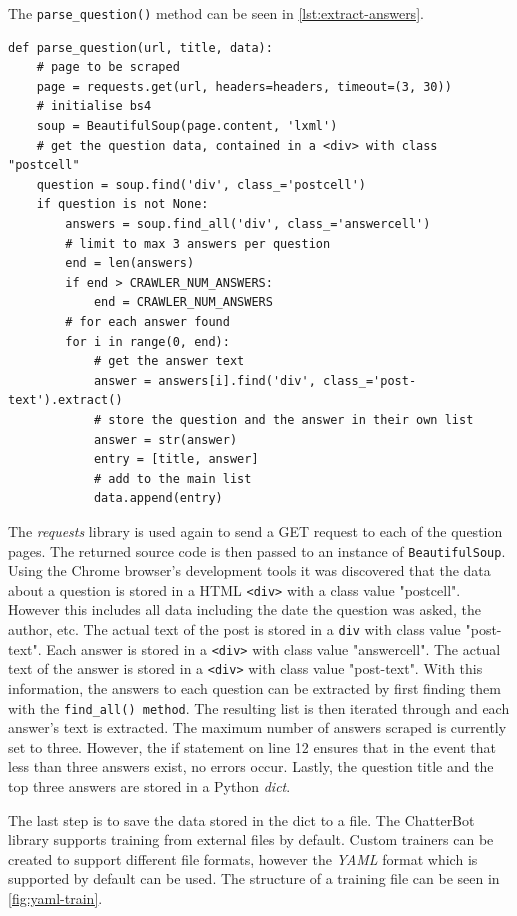 \documentclass[12pt,a4paper]{article}
\newcommand{\captionstyle}[1] {
    \small{\textit{#1}}
}
\begin{document}
The \texttt{parse\_question()} method can be seen in \cref{lst:extract-answers}.
\begin{lstlisting}[caption={\captionstyle{Extracting answers for a specific Stack Overflow question.}}, label={lst:extract-answers}]
    def parse_question(url, title, data):
    # page to be scraped
    page = requests.get(url, headers=headers, timeout=(3, 30))
    # initialise bs4
    soup = BeautifulSoup(page.content, 'lxml')
    # get the question data, contained in a <div> with class "postcell"
    question = soup.find('div', class_='postcell')
    if question is not None:
        answers = soup.find_all('div', class_='answercell')
        # limit to max 3 answers per question
        end = len(answers)
        if end > CRAWLER_NUM_ANSWERS:
            end = CRAWLER_NUM_ANSWERS
        # for each answer found
        for i in range(0, end):
            # get the answer text
            answer = answers[i].find('div', class_='post-text').extract()
            # store the question and the answer in their own list
            answer = str(answer)
            entry = [title, answer]
            # add to the main list
            data.append(entry)
\end{lstlisting}

The \textit{requests} library is used again to send a GET request to each of the question pages. The returned source code is then passed to an instance of \texttt{BeautifulSoup}. Using the Chrome browser's development tools it was discovered that the data about a question is stored in a HTML \texttt{<div>} with a class value "postcell". However this includes all data including the date the question was asked, the author, etc. The actual text of the post is stored in a \texttt{div} with class value "post-text". Each answer is stored in a \texttt{<div>} with class value "answercell". The actual text of the answer is stored in a \texttt{<div>} with class value "post-text". With this information, the answers to each question can be extracted by first finding them with the \texttt{find\_all() method}. The resulting list is then iterated through and each answer's text is extracted. The maximum number of answers scraped is currently set to three. However, the if statement on line 12 ensures that in the event that less than three answers exist, no errors occur. Lastly, the question title and the top three answers are stored in a Python \textit{dict}.

The last step is to save the data stored in the dict to a file. The ChatterBot library supports training from external files by default. Custom trainers can be created to support different file formats, however the \textit{YAML} format which is supported by default can be used. The structure of a training file can be seen in \cref{fig:yaml-train}. 
\end{document}

